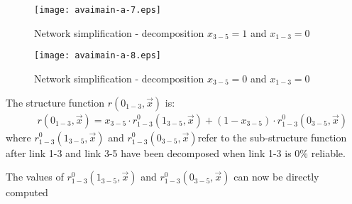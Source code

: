 \begin{figure}[h]
\texttt{[image: avaimain-a-7.eps]}
\caption{Network simplification - decomposition $x_{3-5}=1$ and $x_{1-3}=0$}\label{figavaimain-a:7}
\end{figure}

\begin{figure}[h]
\texttt{[image: avaimain-a-8.eps]}
\caption{Network simplification - decomposition $x_{3-5}=0$ and $x_{1-3}=0$}\label{figavaimain-a:8}
\end{figure}
The structure function $r({0_{1 - 3}},\vec x)$ is:
\begin{eqnarray}
&& r({0_{1 - 3}},\vec x) = {x_{3 - 5}} \cdot r_{1 - 3}^0({1_{3 - 5}},\vec x) + (1 -
{x_{3 - 5}}) \cdot r_{1 - 3}^0({0_{3 - 5}},\vec x)
\label{eqavaimain:9}
\end{eqnarray}
where $r_{1 - 3}^0({1_{3 - 5}},\vec x)$ and $r_{1 - 3}^0({0_{3 -
5}},\vec x)$refer to the sub-structure function after link 1-3 and link 3-5 have
been decomposed when link 1-3 is 0\% reliable.

The values of $r_{1 - 3}^0({1_{3 - 5}},\vec x)$ and $r_{1 - 3}^0({0_{3 -
5}},\vec x)$ can now be directly computed

